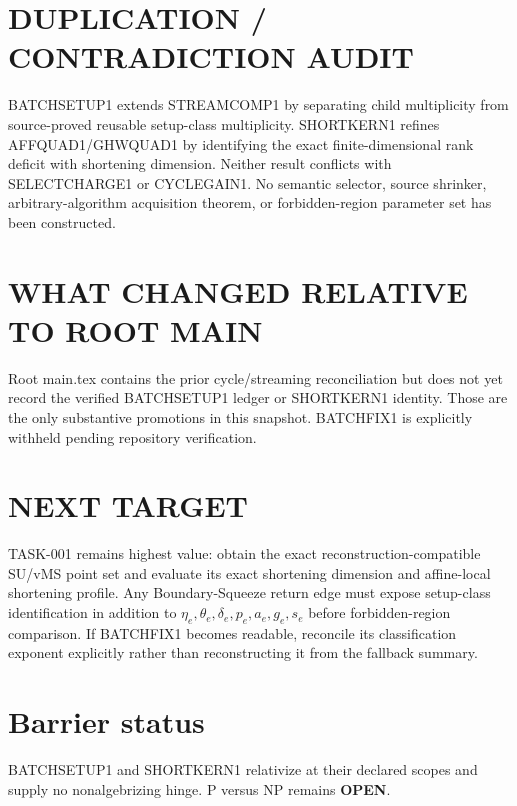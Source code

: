 \documentclass[11pt]{article}
\begin{document}
\section*{DUPLICATION / CONTRADICTION AUDIT}
BATCHSETUP1 extends STREAMCOMP1 by separating child multiplicity from source-proved reusable setup-class multiplicity. SHORTKERN1 refines AFFQUAD1/GHWQUAD1 by identifying the exact finite-dimensional rank deficit with shortening dimension. Neither result conflicts with SELECTCHARGE1 or CYCLEGAIN1. No semantic selector, source shrinker, arbitrary-algorithm acquisition theorem, or forbidden-region parameter set has been constructed.

\section*{WHAT CHANGED RELATIVE TO ROOT MAIN}
Root main.tex contains the prior cycle/streaming reconciliation but does not yet record the verified BATCHSETUP1 ledger or SHORTKERN1 identity. Those are the only substantive promotions in this snapshot. BATCHFIX1 is explicitly withheld pending repository verification.

\section*{NEXT TARGET}
TASK-001 remains highest value: obtain the exact reconstruction-compatible SU/vMS point set and evaluate its exact shortening dimension and affine-local shortening profile. Any Boundary-Squeeze return edge must expose setup-class identification in addition to $\eta_e,\theta_e,\delta_e,p_e,a_e,g_e,s_e$ before forbidden-region comparison. If BATCHFIX1 becomes readable, reconcile its classification exponent explicitly rather than reconstructing it from the fallback summary.

\section*{Barrier status}
BATCHSETUP1 and SHORTKERN1 relativize at their declared scopes and supply no nonalgebrizing hinge. P versus NP remains \textbf{OPEN}.

\end{document}
